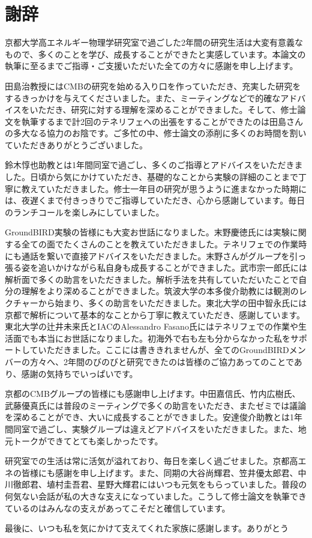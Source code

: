 \chapter{謝辞}

京都大学高エネルギー物理学研究室で過ごした2年間の研究生活は大変有意義なもので、多くのことを学び、成長することができたと実感しています。本論文の執筆に至るまでご指導・ご支援いただいた全ての方々に感謝を申し上げます。

田島治教授にはCMBの研究を始める入り口を作っていただき、充実した研究をするきっかけを与えてくださいました。また、ミーティングなどで的確なアドバイスをいただき、研究に対する理解を深めることができました。そして、修士論文を執筆するまで計2回のテネリフェへの出張をすることができたのは田島さんの多大なる協力のお陰です。ご多忙の中、修士論文の添削に多くのお時間を割いていただきありがとうございました。

鈴木惇也助教とは1年間同室で過ごし、多くのご指導とアドバイスをいただきました。日頃から気にかけていただき、基礎的なことから実験の詳細のことまで丁寧に教えていただきました。修士一年目の研究が思うように進まなかった時期には、夜遅くまで付きっきりでご指導していただき、心から感謝しています。毎日のランチコールを楽しみにしていました。

GroundBIRD実験の皆様にも大変お世話になりました。末野慶徳氏には実験に関する全ての面でたくさんのことを教えていただきました。テネリフェでの作業時にも通話を繋いで直接アドバイスをいただきました。末野さんがグループを引っ張る姿を追いかけながら私自身も成長することができました。武市宗一郎氏には解析面で多くの助言をいただきました。解析手法を共有していただいたことで自分の理解をより深めることができました。筑波大学の本多俊介助教には観測のレクチャーから始まり、多くの助言をいただきました。東北大学の田中智永氏には京都で解析について基本的なことから丁寧に教えていただき、感謝しています。東北大学の辻井未来氏とIACのAlessandro Fasano氏にはテネリフェでの作業や生活面でも本当にお世話になりました。初海外で右も左も分からなかった私をサポートしていただきました。ここには書ききれませんが、全てのGroundBIRDメンバーの方々へ、2年間のびのびと研究できたのは皆様のご協力あってのことであり、感謝の気持ちでいっぱいです。

京都のCMBグループの皆様にも感謝申し上げます。中田嘉信氏、竹内広樹氏、武藤優真氏には普段のミーティングで多くの助言をいただき、またゼミでは議論を深めることができ、大いに成長することができました。安達俊介助教とは1年間同室で過ごし、実験グループは違えどアドバイスをいただきました。また、地元トークができてとても楽しかったです。

研究室での生活は常に活気が溢れており、毎日を楽しく過ごせました。京都高エネの皆様にも感謝を申し上げます。また、同期の大谷尚輝君、笠井優太郎君、中川徹郎君、埴村圭吾君、星野大輝君にはいつも元気をもらっていました。普段の何気ない会話が私の大きな支えになっていました。こうして修士論文を執筆できているのはみんなの支えがあってこそだと確信しています。

最後に、いつも私を気にかけて支えてくれた家族に感謝します。ありがとう
